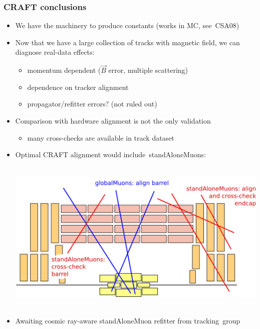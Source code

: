 \documentclass[compress]{beamer}
\begin{document}
\begin{frame}
\frametitle{CRAFT conclusions}

\begin{itemize}\setlength{\itemsep}{-0.05 cm}
\item We have the machinery to produce constants (works in MC, \mbox{see CSA08)\hspace{-1 cm}}
\item Now that we have a large collection of tracks with magnetic
  field, we can diagnose real-data effects:

\vspace{-0.1 cm}
\begin{itemize}\setlength{\itemsep}{-0.025 cm}
\item momentum dependent ($\vec{B}$ error, multiple scattering)
\item dependence on tracker alignment
\item propagator/refitter errors?  (not ruled out)
\end{itemize}
\item Comparison with hardware alignment is not the only validation

\vspace{-0.1 cm}
\begin{itemize}
\item many cross-checks are available in track dataset
\end{itemize}

\item Optimal CRAFT alignment would \mbox{include standAloneMuons:\hspace{-1 cm}}

\mbox{ } \hfill \includegraphics[width=0.7\linewidth]{globalMuons_and_standAloneMuons.png} \hfill \mbox{ }

\item Awaiting cosmic ray-aware standAloneMuon refitter from \mbox{tracking group\hspace{-1 cm}}
\end{itemize}
\end{frame}
\end{document}

